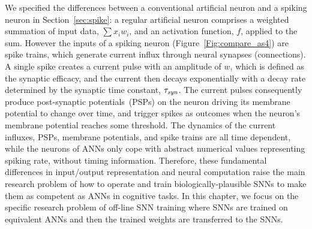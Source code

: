 	We specified the differences between a conventional artificial neuron and a spiking neuron in Section~\ref{sec:spike}: a regular artificial neuron comprises a weighted summation of input data, $\sum x_i w_i$, and an activation function, $f$, applied to the sum.
	However the inputs of a spiking neuron (Figure~\ref{Fig:compare_as4}) are spike trains, which generate current influx through neural synapses (connections).
	A single spike creates a current pulse with an amplitude of $w$, which is defined as the synaptic efficacy, and the current then decays exponentially with a decay rate determined by the synaptic time constant, $\tau_{\textit{\textrm{syn}}}$.
	The current pulses consequently produce post-synaptic potentials~(PSPs) on the neuron driving its membrane potential to change over time, and trigger spikes as outcomes when the neuron's membrane potential reaches some threshold.
	The dynamics of the current influxes, PSPs, membrane potentials, and spike trains are all time dependent, while the neurons of ANNs only cope with abstract numerical values representing spiking rate, without timing information.
	Therefore, these fundamental differences in input/output representation and neural computation raise the main research problem of how to operate and train biologically-plausible SNNs to make them as competent as ANNs in cognitive tasks.
	In this chapter, we focus on the specific research problem of off-line SNN training where SNNs are trained on equivalent ANNs and then the trained weights are transferred to the SNNs.
	
